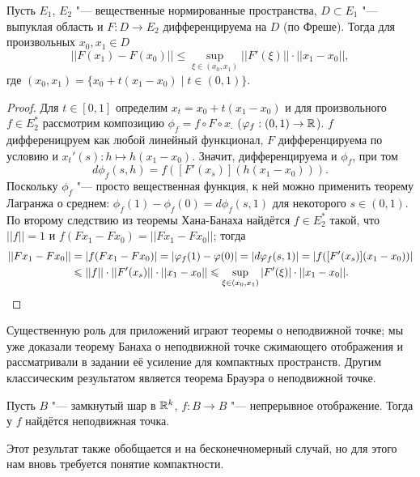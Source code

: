 \documentclass[main]{subfiles}
\begin{document}
\begin{theorem}
  Пусть \( E_1 \), \( E_2 \) "--- вещественные
  нормированные пространства,
  \( D \subset E_1 \) "--- выпуклая область
  и \( F : D \to E_2 \) дифференцируема на \( D \)
  (по Фреше).
  Тогда для произвольных \( x_0, x_1 \in D \)
  \[
    ||F(x_1) - F(x_0)|| \le \sup_{\xi \in (x_0, x_1)} ||F'(\xi)|| \cdot ||x_1 - x_0||,
  \]
  где \( (x_0, x_1) = \{ x_0 + t (x_1 - x_0) \mid t \in (0, 1) \} \).
\end{theorem}
\begin{proof}
  Для \( t \in [0, 1] \) определим
  \( x_t = x_0 + t (x_1 - x_0) \) и
  для произвольного \( f \in E_2^* \)
  рассмотрим композицию
  \( \phi_f = f \circ F \circ x_{\boldsymbol{\cdot}} \)
  (\( \phi_f : (0, 1) \to \Real \)).
  \( f \) дифференицруем как любой линейный функционал,
  \( F \) дифференцируема по условию
  и \( x_t'(s) : h \mapsto h (x_1 - x_0) \).
  Значит, дифференцируема и \( \phi_f \),
  при том
  \[
    d\phi_f(s, h) =
    f([F'(x_s)] (h (x_1 - x_0))).
  \]
  Поскольку \( \phi_f \) "--- просто
  вещественная функция,
  к ней можно применить теорему Лагранжа о среднем:
  \( \phi_f(1) - \phi_f(0) = d \phi_f(s, 1) \)
  для некоторого \( s \in (0, 1) \).
  По второму следствию из теоремы Хана-Банаха
  найдётся \( f \in E_2^* \) такой,
  что \( ||f|| = 1 \) и \( f(F x_1 - F x_0) =
  ||F x_1 - F x_0|| \);
  тогда
  \begin{align}
    ||F x_1 - F x_0|| &= |f(F x_1 - F x_0)| =
    |\phi_f(1) - \phi(0)| =
    |d \phi_f (s, 1)| = 
    |f([F'(x_s)](x_1 - x_0))| \\ 
    &\le ||f|| \cdot ||F'(x_s)|| \cdot ||x_1 - x_0|| \le
    \sup_{\xi \in (x_0, x_1)} |F'(\xi)| \cdot ||x_1 - x_0||.
    \qedhere
  \end{align}
\end{proof}

Существенную роль для приложений играют
теоремы о неподвижной точке;
мы уже доказали теорему Банаха о
неподвижной точке сжимающего отображения
и рассматривали в задании
её усиление для компактных пространств.
Другим классическим результатом
является теорема Брауэра о неподвижной точке.

\begin{theorem*}[Брауэр, 1910]
  Пусть \( B \) "--- замкнутый шар в \( \Real^k \),
  \( f : B \to B \) "--- непрерывное отображение.
  Тогда у \( f \) найдётся неподвижная точка.
\end{theorem*}

Этот результат также обобщается
и на бесконечномерный случай,
но для этого нам вновь требуется
понятие компактности.
\end{document}

